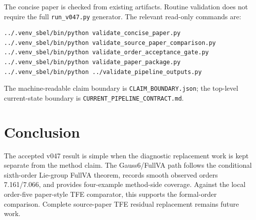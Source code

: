 \documentclass[11pt]{article}
\newcommand{\method}{Gauss6\slash FullVA}
\newcommand{\tfe}{TFE}
\newcommand{\artifact}[1]{\nolinkurl{#1}}
\begin{document}
The concise paper is checked from existing artifacts.  Routine validation does
not require the full \artifact{run_v047.py} generator.  The relevant read-only
commands are:
\begin{verbatim}
../.venv_sbel/bin/python validate_concise_paper.py
../.venv_sbel/bin/python validate_source_paper_comparison.py
../.venv_sbel/bin/python validate_order_acceptance_gate.py
../.venv_sbel/bin/python validate_paper_package.py
../.venv_sbel/bin/python ../validate_pipeline_outputs.py
\end{verbatim}
The machine-readable claim boundary is \artifact{CLAIM_BOUNDARY.json}; the
top-level current-state boundary is \artifact{CURRENT_PIPELINE_CONTRACT.md}.

\section{Conclusion}

The accepted v047 result is simple when the diagnostic replacement work is
kept separate from the method claim.  The \method{} path follows the
conditional sixth-order Lie-group FullVA theorem, records smooth observed
orders 7.161/7.066, and provides four-example method-side coverage.  Against
the local order-five paper-style \tfe{} comparator, this supports the
formal-order comparison.  Complete source-paper \tfe{} residual replacement
remains future work.
\end{document}

